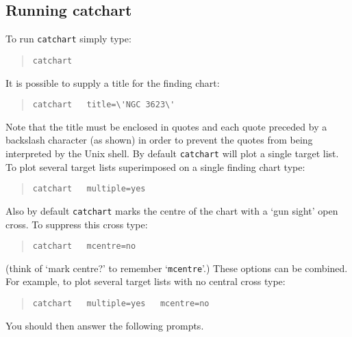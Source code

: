 \documentclass[twoside,11pt]{article}
\renewcommand{\_}{\texttt{\symbol{95}}}
\begin{document}
\subsection{\label{RCATCHART}Running catchart}

To run {\tt catchart} simply type:

\begin{verse}
{\tt catchart}
\end{verse}

It is possible to supply a title for the finding chart:

\begin{verse}
{\tt catchart ~ title=\verb-\'NGC 3623\'-}
\end{verse}


Note that the title must be enclosed in quotes and each quote preceded
by a backslash character (as shown) in order to prevent the quotes from
being interpreted by the Unix shell.  By default {\tt catchart} will plot
a single target list.  To plot several target lists superimposed on a
single finding chart type:

\begin{verse}
{\tt catchart ~ multiple=yes}
\end{verse}

Also by default {\tt catchart} marks the centre of the chart with a `gun
sight' open cross.  To suppress this cross type:

\begin{verse}
{\tt catchart ~ mcentre=no}
\end{verse}

(think of `mark centre?' to remember `{\tt mcentre}'.)  These options
can be combined.  For example, to plot several target lists with no
central cross type:

\begin{verse}
{\tt catchart ~ multiple=yes ~ mcentre=no}
\end{verse}

You should then answer the following prompts.
\end{document}
